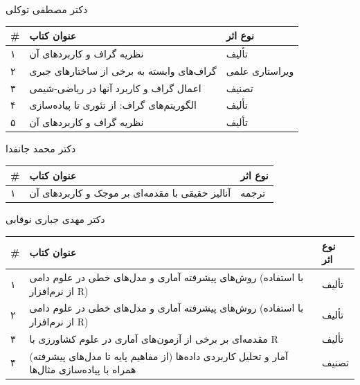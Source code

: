 \documentclass[
  letterpaper,
  DIV=11,
  numbers=noendperiod]{scrreprt}
\newcounter{none} %
\begin{document}
دکتر مصطفی توکلی

{\def\LTcaptype{none} %
\begin{longtable}[]{@{}lll@{}}
\toprule\noalign{}
\# & عنوان کتاب & نوع اثر \\
\midrule\noalign{}
\endhead
\bottomrule\noalign{}
\endlastfoot
۱ & نظریه گراف و کاربردهای آن & تألیف \\
۲ & گراف‌های وابسته به برخی از ساختارهای جبری & ویراستاری علمی \\
۳ & اعمال گراف و کاربرد آنها در ریاضی-شیمی & تصنیف \\
۴ & الگوریتم‌های گراف: از تئوری تا پیاده‌سازی & تألیف \\
۵ & نظریه گراف و کاربردهای آن & تألیف \\
\end{longtable}
}

دکتر محمد جانفدا

{\def\LTcaptype{none} %
\begin{longtable}[]{@{}lll@{}}
\toprule\noalign{}
\# & عنوان کتاب & نوع اثر \\
\midrule\noalign{}
\endhead
\bottomrule\noalign{}
\endlastfoot
۱ & آنالیز حقیقی با مقدمه‌ای بر موجک و کاربردهای آن & ترجمه \\
\end{longtable}
}

دکتر مهدی جباری نوقابی

{\def\LTcaptype{none} %
\begin{longtable}[]{@{}
  >{\raggedright\arraybackslash}p{}
  >{\raggedright\arraybackslash}p{}
  >{\raggedright\arraybackslash}p{}@{}}
\toprule\noalign{}
\begin{minipage}[b]{\linewidth}\raggedright
\#
\end{minipage} & \begin{minipage}[b]{\linewidth}\raggedright
عنوان کتاب
\end{minipage} & \begin{minipage}[b]{\linewidth}\raggedright
نوع اثر
\end{minipage} \\
\midrule\noalign{}
\endhead
\bottomrule\noalign{}
\endlastfoot
۱ & روش‌های پیشرفته آماری و مدل‌های خطی در علوم دامی (با استفاده از
نرم‌افزار R) & تألیف \\
۲ & روش‌های پیشرفته آماری و مدل‌های خطی در علوم دامی (با استفاده از
نرم‌افزار R) & تألیف \\
۳ & مقدمه‌ای بر برخی از آزمون‌های آماری در علوم کشاورزی با R & تألیف \\
۴ & آمار و تحلیل کاربردی داده‌ها (از مفاهیم پایه تا مدل‌های پیشرفته) همراه
با پیاده‌سازی مثال‌ها & تصنیف \\
\end{longtable}
}
\end{document}
